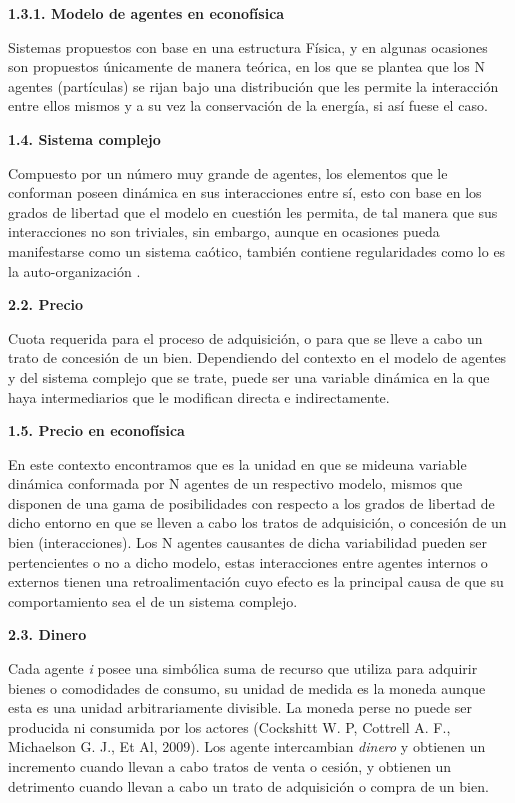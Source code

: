 {
\noindent
\Large  \textbf{1.3.1. Modelo de agentes en econofísica} 
}

Sistemas propuestos con base en una estructura Física, y en algunas ocasiones son propuestos únicamente de manera teórica, en los que se plantea que los N agentes (partículas) se rijan bajo una distribución que les permite la interacción entre ellos mismos y a su vez la conservación de la energía, si así fuese el caso.
\newline

{
\noindent
\Large  \textbf{1.4. Sistema complejo} 
}

Compuesto por un número muy grande de agentes, los elementos que le conforman poseen dinámica en sus interacciones entre sí, esto con base en los grados de libertad que el modelo en cuestión les permita, de tal manera que sus interacciones no son triviales, sin embargo, aunque en ocasiones pueda manifestarse como un sistema caótico, también contiene regularidades como lo es la auto-organización .
\newline

{
\noindent
\Large  \textbf{2.2. Precio} 
}

Cuota requerida para el proceso de adquisición, o para que se lleve a cabo un trato de concesión de un bien. Dependiendo del contexto en el modelo de agentes y del sistema complejo que se trate, puede ser una variable dinámica en la que haya intermediarios que le modifican directa e indirectamente.
\newline

{
\noindent
\Large  \textbf{1.5. Precio en econofísica} 
}

En este contexto encontramos que es la unidad en que se \guillemotleft  mide\guillemotright una variable dinámica conformada por N agentes de un respectivo modelo, mismos que disponen de una gama de posibilidades con respecto a los grados de libertad de dicho entorno en que se lleven a cabo los tratos de adquisición, o concesión de un bien (interacciones). Los N agentes causantes de dicha variabilidad pueden ser pertencientes o no a dicho modelo, estas interacciones entre agentes internos o externos tienen una retroalimentación cuyo efecto es la principal causa de que su comportamiento sea el de un sistema complejo.

\newpage

{
\noindent
\Large  \textbf{2.3.  Dinero} 
}

Cada agente \textit{i} posee una simbólica suma de recurso que utiliza para adquirir bienes o comodidades de consumo, su unidad de medida es la \guillemotleft moneda \guillemotright aunque esta es una unidad arbitrariamente divisible. La moneda perse no puede ser producida ni consumida por los actores   (Cockshitt W. P, Cottrell A. F., Michaelson G. J., Et  Al, 2009). Los agente intercambian \textit{dinero}  y obtienen un incremento cuando llevan a cabo tratos de venta o cesión, y obtienen un detrimento cuando llevan a cabo un trato de adquisición o compra de un bien. 
\newline


